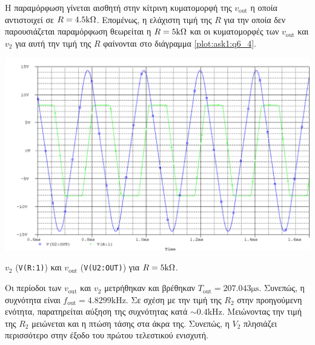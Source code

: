 Η παραμόρφωση γίνεται αισθητή στην κίτρινη κυματομορφή της $v_{\mathrm{out}}$ η οποία αντιστοιχεί σε $R=4.5\kohm$. Επομένως, η ελάχιστη τιμή της $R$ για την οποία δεν παρουσιάζεται παραμόρφωση θεωρείται η $R=5\kohm$ και οι κυματομορφές των $v_{\mathrm{out}}$ και $v_2$ για αυτή την  τιμή της $R$ φαίνονται στο διάγραμμα \ref{plot:ask1:q6_4}.

\begin{plot_fig}[H]
	\begin{center}
		\includegraphics[width=15cm]{spice_01/1.6 d}
		\caption{$v_2$ (\texttt{V(R:1)}) και $v_{\mathrm{out}}$ (\texttt{V(U2:OUT)}) για $R=5\kohm$.}
		\label{plot:ask1:q6_4}
	\end{center}
\end{plot_fig}

Οι περίοδοι των $v_{\mathrm{out}}$ και $v_2$ μετρήθηκαν και βρέθηκαν $T_{\mathrm{out}}=207.043\unit{\micro\second}$. Συνεπώς, η συχνότητα είναι $f_{\mathrm{out}}=4.8299\unit{\kilo\hertz}$. Σε σχέση με την τιμή της $R_2$ στην προηγούμενη ενότητα, παρατηρείται αύξηση της συχνότητας κατά $\sim0.4\unit{\kilo\hertz}$. Μειώνοντας την τιμή της $R_2$ μειώνεται και η πτώση τάσης στα άκρα της. Συνεπώς, η $V_2$ πλησιάζει περισσότερο στην έξοδο του πρώτου τελεστικού ενισχυτή.\par